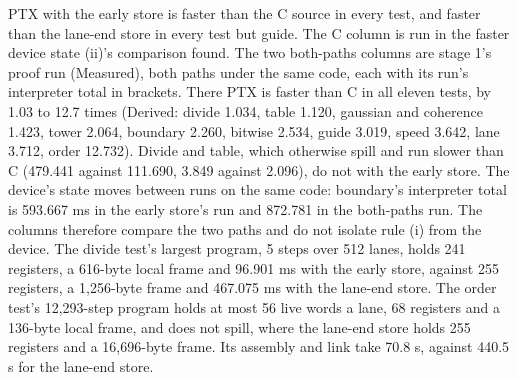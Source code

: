 \begin{enumerate}
\begin{itemize}
\begin{enumerate}
\begin{itemize}
PTX with the early store is faster than the C source in every test, and faster than the lane-end store in every test but guide. The C column is run in the faster device state (ii)'s comparison found. The two both-paths columns are stage 1's proof run (Measured), both paths under the same code, each with its run's interpreter total in brackets. There PTX is faster than C in all eleven tests, by 1.03 to 12.7 times (Derived: divide 1.034, table 1.120, gaussian and coherence 1.423, tower 2.064, boundary 2.260, bitwise 2.534, guide 3.019, speed 3.642, lane 3.712, order 12.732). Divide and table, which otherwise spill and run slower than C (479.441 against 111.690, 3.849 against 2.096), do not with the early store. The device's state moves between runs on the same code: boundary's interpreter total is 593.667 ms in the early store's run and 872.781 in the both-paths run. The columns therefore compare the two paths and do not isolate rule (i) from the device. The divide test's largest program, 5 steps over 512 lanes, holds 241 registers, a 616-byte local frame and 96.901 ms with the early store, against 255 registers, a 1,256-byte frame and 467.075 ms with the lane-end store. The order test's 12,293-step program holds at most 56 live words a lane, 68 registers and a 136-byte local frame, and does not spill, where the lane-end store holds 255 registers and a 16,696-byte frame. Its assembly and link take 70.8 s, against 440.5 s for the lane-end store.


\end{itemize}
\end{enumerate}
\end{itemize}
\end{enumerate}
